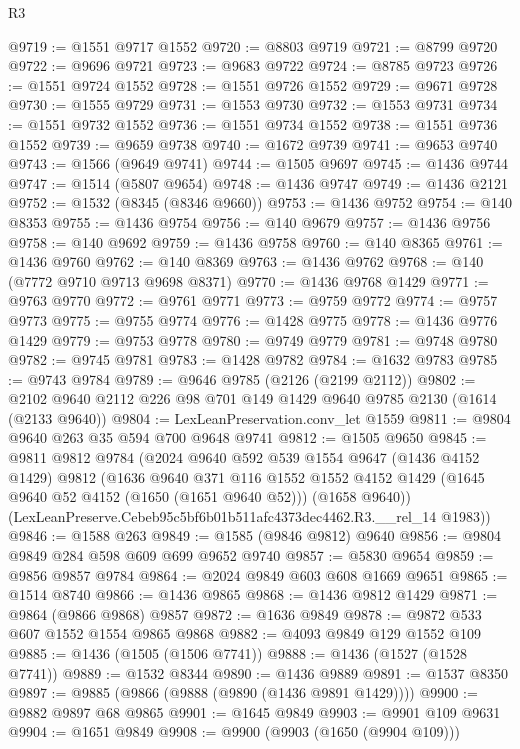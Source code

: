 \begin{lexlean}{R3}
\begin{coremodule}
@9719 := @1551 @9717 @1552
@9720 := @8803 @9719
@9721 := @8799 @9720
@9722 := @9696 @9721
@9723 := @9683 @9722
@9724 := @8785 @9723
@9726 := @1551 @9724 @1552
@9728 := @1551 @9726 @1552
@9729 := @9671 @9728
@9730 := @1555 @9729
@9731 := @1553 @9730
@9732 := @1553 @9731
@9734 := @1551 @9732 @1552
@9736 := @1551 @9734 @1552
@9738 := @1551 @9736 @1552
@9739 := @9659 @9738
@9740 := @1672 @9739
@9741 := @9653 @9740
@9743 := @1566 (@9649 @9741)
@9744 := @1505 @9697
@9745 := @1436 @9744
@9747 := @1514 (@5807 @9654)
@9748 := @1436 @9747
@9749 := @1436 @2121
@9752 := @1532 (@8345 (@8346 @9660))
@9753 := @1436 @9752
@9754 := @140 @8353
@9755 := @1436 @9754
@9756 := @140 @9679
@9757 := @1436 @9756
@9758 := @140 @9692
@9759 := @1436 @9758
@9760 := @140 @8365
@9761 := @1436 @9760
@9762 := @140 @8369
@9763 := @1436 @9762
@9768 := @140 (@7772 @9710 @9713 @9698 @8371)
@9770 := @1436 @9768 @1429
@9771 := @9763 @9770
@9772 := @9761 @9771
@9773 := @9759 @9772
@9774 := @9757 @9773
@9775 := @9755 @9774
@9776 := @1428 @9775
@9778 := @1436 @9776 @1429
@9779 := @9753 @9778
@9780 := @9749 @9779
@9781 := @9748 @9780
@9782 := @9745 @9781
@9783 := @1428 @9782
@9784 := @1632 @9783
@9785 := @9743 @9784
@9789 := @9646 @9785 (@2126 (@2199 @2112))
@9802 := @2102 @9640 @2112 @226 @98 @701 @149 @1429 @9640 @9785 @2130 (@1614 (@2133 @9640))
@9804 := LexLeanPreservation.conv_let @1559
@9811 := @9804 @9640 @263 @35 @594 @700 @9648 @9741
@9812 := @1505 @9650
@9845 := @9811
    @9812
    @9784
    (@2024
      @9640
      @592
      @539
      @1554
      @9647
      (@1436 @4152 @1429)
      @9812
      (@1636
        @9640
        @371
        @116
        @1552
        @1552
        @4152
        @1429
        (@1645 @9640 @52 @4152 (@1650 (@1651 @9640 @52)))
        (@1658 @9640))
      (LexLeanPreserve.Cebeb95c5bf6b01b511afc4373dec4462.R3.__rel_14 @1983))
@9846 := @1588 @263
@9849 := @1585 (@9846 @9812) @9640
@9856 := @9804 @9849 @284 @598 @609 @699 @9652 @9740
@9857 := @5830 @9654
@9859 := @9856 @9857 @9784
@9864 := @2024 @9849 @603 @608 @1669 @9651
@9865 := @1514 @8740
@9866 := @1436 @9865
@9868 := @1436 @9812 @1429
@9871 := @9864 (@9866 @9868) @9857
@9872 := @1636 @9849
@9878 := @9872 @533 @607 @1552 @1554 @9865 @9868
@9882 := @4093 @9849 @129 @1552 @109
@9885 := @1436 (@1505 (@1506 @7741))
@9888 := @1436 (@1527 (@1528 @7741))
@9889 := @1532 @8344
@9890 := @1436 @9889
@9891 := @1537 @8350
@9897 := @9885 (@9866 (@9888 (@9890 (@1436 @9891 @1429))))
@9900 := @9882 @9897 @68 @9865
@9901 := @1645 @9849
@9903 := @9901 @109 @9631
@9904 := @1651 @9849
@9908 := @9900 (@9903 (@1650 (@9904 @109)))

\end{coremodule}
\end{lexlean}
